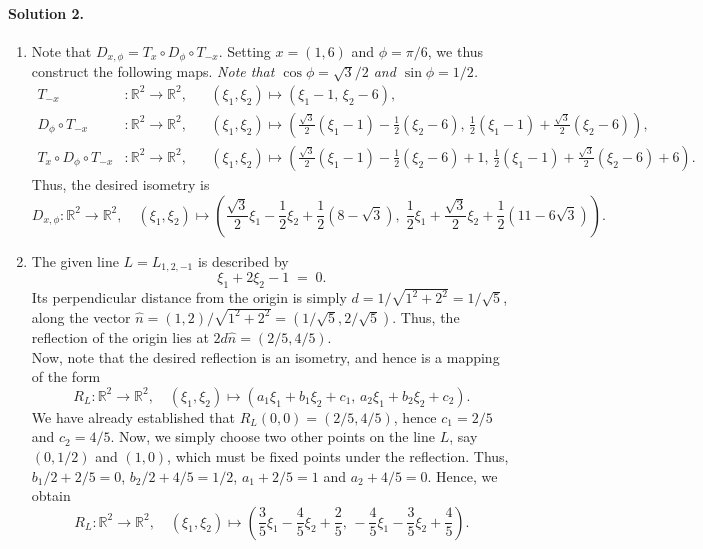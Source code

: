 \documentclass[10pt]{article}
\begin{document}
        \paragraph{Solution 2.}
        \begin{enumerate}
        \item 
        Note that $D_{x,\phi} = T_x \circ D_\phi \circ T_{-x}$. Setting $x = (1, 6)$ and $\phi = \pi /6$, we thus construct the following maps.
        \textit{Note that $\cos\phi = \sqrt{3} /2$ and $\sin\phi = 1 /2$.} 
        \begin{align*}
                T_{-x}&\colon \mathbb{R}^2 \to \mathbb{R}^2, && (\xi_1,\xi_2) \mapsto \left(\xi_1 - 1,\, \xi_2 - 6\right), \\
                D_\phi\circ T_{-x}&\colon \mathbb{R}^2 \to \mathbb{R}^2, &&
                        (\xi_1,\xi_2) \mapsto \left(\frac{\sqrt{3}}{2}(\xi_1 - 1) - \frac{1}{2}\left(\xi_2 - 6\right),\, 
                                                                \frac{1}{2}(\xi_1 - 1) + \frac{\sqrt{3}}{2}\left(\xi_2 - 6\right)\right), \\
                T_x \circ D_\phi\circ T_{-x}&\colon \mathbb{R}^2 \to \mathbb{R}^2, &&
                        (\xi_1,\xi_2) \mapsto \left(\frac{\sqrt{3}}{2}(\xi_1 - 1) - \frac{1}{2}\left(\xi_2 - 6\right) + 1,\, 
                                                                \frac{1}{2}(\xi_1 - 1) + \frac{\sqrt{3}}{2}\left(\xi_2 - 6\right) + 6\right).
        \end{align*}    
        Thus, the desired isometry is 
        \[
        D_{x,\phi}\colon \mathbb{R}^2 \to \mathbb{R}^2, \quad (\xi_1, \xi_2) \mapsto 
                                \left(\frac{\sqrt{3}}{2}\xi_1 - \frac{1}{2}\xi_2 + \frac{1}{2}(8 - \sqrt{3}),\;
                                \frac{1}{2}\xi_1 + \frac{\sqrt{3}}{2}\xi_2 + \frac{1}{2}(11 - 6\sqrt{3}) \right).
        \]


        \item The given line $L = L_{1,2,-1}$ is described by
        \[
                \xi_1 + 2\xi_2 -1 \;=\; 0.
        \]
        Its perpendicular distance from the origin is simply $d = 1 /\sqrt{1^2 + 2^2} = 1 /\sqrt{5}$, along the
        vector $\hat{n} = (1, 2) / \sqrt{1^2 + 2^2} = (1 /\sqrt{5}, 2 /\sqrt{5})$. Thus, the reflection of the origin lies
        at $2 d \hat{n} = (2 / 5, 4 / 5)$. \\

        Now, note that the desired reflection is an isometry, and hence is a mapping of the form
        \[R_L\colon \mathbb{R}^2\to \mathbb{R}^2,\quad (\xi_1, \xi_2) \mapsto (a_1\xi_1 + b_1\xi_2 + c_1,\, a_2\xi_1 + b_2\xi_2 + c_2).\]
        We have already established that $R_L(0, 0) = (2 /5, 4 /5)$, hence $c_1 = 2 /5$ and $c_2 = 4 /5$.
        Now, we simply choose two other points on the line $L$, say $(0, 1 /2)$ and $(1, 0)$, which must be fixed points under the reflection.
        Thus, $b_1 / 2 + 2 / 5 = 0$, $b_2 / 2 + 4 / 5 = 1 / 2$, $a_1 + 2 / 5 = 1$ and $a_2 + 4 / 5 = 0$.
        Hence, we obtain
        \[R_L\colon \mathbb{R}^2\to \mathbb{R}^2,\quad (\xi_1, \xi_2) \mapsto \left(\frac{3}{5}\xi_1 -\frac{4}{5}\xi_2 + \frac{2}{5},\,
                -\frac{4}{5}\xi_1 - \frac{3}{5}\xi_2 + \frac{4}{5}\right).\]



\end{enumerate}
\end{document}
